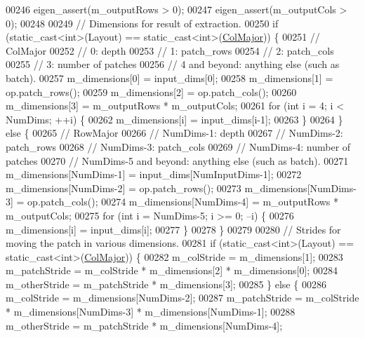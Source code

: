 \begin{DoxyCode}
00246     eigen\_assert(m\_outputRows > 0);
00247     eigen\_assert(m\_outputCols > 0);
00248 
00249     \textcolor{comment}{// Dimensions for result of extraction.}
00250     \textcolor{keywordflow}{if} (static\_cast<int>(Layout) == static\_cast<int>(\hyperlink{group__enums_ggaacded1a18ae58b0f554751f6cdf9eb13a0cbd4bdd0abcfc0224c5fcb5e4f6669a}{ColMajor})) \{
00251       \textcolor{comment}{// ColMajor}
00252       \textcolor{comment}{// 0: depth}
00253       \textcolor{comment}{// 1: patch\_rows}
00254       \textcolor{comment}{// 2: patch\_cols}
00255       \textcolor{comment}{// 3: number of patches}
00256       \textcolor{comment}{// 4 and beyond: anything else (such as batch).}
00257       m\_dimensions[0] = input\_dims[0];
00258       m\_dimensions[1] = op.patch\_rows();
00259       m\_dimensions[2] = op.patch\_cols();
00260       m\_dimensions[3] = m\_outputRows * m\_outputCols;
00261       \textcolor{keywordflow}{for} (\textcolor{keywordtype}{int} i = 4; i < NumDims; ++i) \{
00262         m\_dimensions[i] = input\_dims[i-1];
00263       \}
00264     \} \textcolor{keywordflow}{else} \{
00265       \textcolor{comment}{// RowMajor}
00266       \textcolor{comment}{// NumDims-1: depth}
00267       \textcolor{comment}{// NumDims-2: patch\_rows}
00268       \textcolor{comment}{// NumDims-3: patch\_cols}
00269       \textcolor{comment}{// NumDims-4: number of patches}
00270       \textcolor{comment}{// NumDims-5 and beyond: anything else (such as batch).}
00271       m\_dimensions[NumDims-1] = input\_dims[NumInputDims-1];
00272       m\_dimensions[NumDims-2] = op.patch\_rows();
00273       m\_dimensions[NumDims-3] = op.patch\_cols();
00274       m\_dimensions[NumDims-4] = m\_outputRows * m\_outputCols;
00275       \textcolor{keywordflow}{for} (\textcolor{keywordtype}{int} i = NumDims-5; i >= 0; --i) \{
00276         m\_dimensions[i] = input\_dims[i];
00277       \}
00278     \}
00279 
00280     \textcolor{comment}{// Strides for moving the patch in various dimensions.}
00281     \textcolor{keywordflow}{if} (static\_cast<int>(Layout) == static\_cast<int>(\hyperlink{group__enums_ggaacded1a18ae58b0f554751f6cdf9eb13a0cbd4bdd0abcfc0224c5fcb5e4f6669a}{ColMajor})) \{
00282       m\_colStride = m\_dimensions[1];
00283       m\_patchStride = m\_colStride * m\_dimensions[2] * m\_dimensions[0];
00284       m\_otherStride = m\_patchStride * m\_dimensions[3];
00285     \} \textcolor{keywordflow}{else} \{
00286       m\_colStride = m\_dimensions[NumDims-2];
00287       m\_patchStride = m\_colStride * m\_dimensions[NumDims-3] * m\_dimensions[NumDims-1];
00288       m\_otherStride = m\_patchStride * m\_dimensions[NumDims-4];

\end{DoxyCode}
